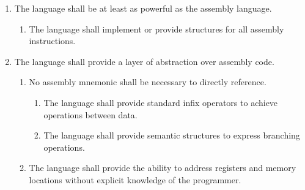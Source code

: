 \documentclass{article}
\begin{document}
\begin{enumerate}[label=R\arabic*]
    \item The language shall be at least as powerful as the assembly language.
    \begin{enumerate}[label=\theenumi.\arabic*]
        \item The language shall implement or provide structures for all assembly instructions.
    \end{enumerate}
    \item The language shall provide a layer of abstraction over assembly code.
    \begin{enumerate}[label=\theenumi.\arabic*]
        \item No assembly mnemonic shall be necessary to directly reference.
        \begin{enumerate}[label=\theenumii.\arabic*]
            \item The language shall provide standard infix operators to achieve operations between data.
            \item The language shall provide semantic structures to express branching operations.
        \end{enumerate}
        \item The language shall provide the ability to address registers and memory locations without explicit knowledge of the programmer.
    \end{enumerate}
\end{enumerate}
\end{document}
